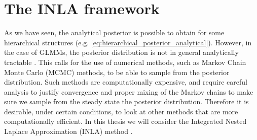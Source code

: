 



\section{The INLA framework}
\label{sec:INLA_framework}
As we have seen, the analytical posterior is possible to obtain for some hierarchical structures (e.g. \eqref{eq:hierarchical_posterior_analytical}). 
However, in the case of GLMMs, the posterior distribution is not in general analytically tractable \citep{fong2010bayesian}. This calls for the use of numerical methods, such as Markov Chain Monte Carlo (MCMC) methods, to be able to sample from the posterior distribution. 
Such methods are computationally expensive, and require careful analysis to justify convergence and proper mixing of the Markov chains to make sure we sample from the steady state the posterior distribution. Therefore it is desirable, under certain conditions, to look at other methods that are more computationally efficient.
In this thesis we will consider the Integrated Nested Laplace Approximation (INLA) method \citep{gomezrubio2020inla}.
